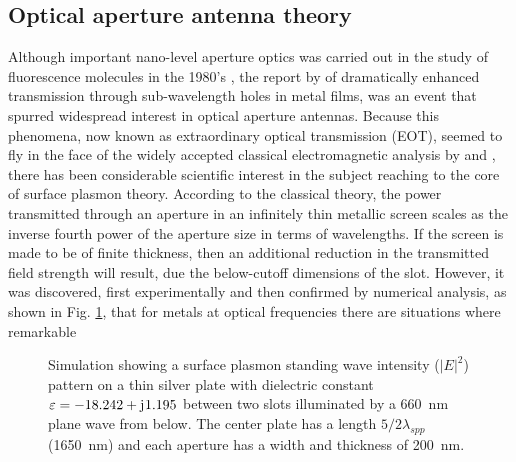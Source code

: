 \documentclass[11pt]{article}
\begin{document}
\subsection{Optical aperture antenna theory}
%
Although important nano-level aperture optics was carried out in the study of fluorescence molecules in the 1980's \cite{Fischer1986}, the report by \cite{Ebbesen1998} of dramatically enhanced transmission through sub-wavelength holes in metal films, was an event that spurred widespread interest in optical aperture antennas. Because this phenomena, now known as extraordinary optical transmission (EOT), seemed to fly in the face of the widely accepted classical electromagnetic analysis by \cite{Bethe1944} and \cite{Bouwkamp1950}, there has been considerable scientific interest in the subject reaching to the core of surface plasmon theory. According to the classical theory, the power transmitted through an aperture in an infinitely thin metallic screen scales as the inverse fourth power of the aperture size in terms of wavelengths. If the screen is made to be of finite thickness, then an additional reduction in the transmitted field strength will result, due the below-cutoff dimensions of the slot. However, it was discovered, first experimentally and then confirmed by
numerical analysis, as shown in Fig. \ref{fig:cst_simulation}, that for metals at optical frequencies there are situations where remarkable
%
\begin{figure}[h!]
  \centering
  \caption{Simulation showing a surface plasmon standing wave intensity ($|E|^2$) pattern on a thin silver plate with dielectric constant $\varepsilon= -18.242 + \mathrm{j}\mkern1mu 1.195$ between two slots illuminated by a \SI{660}{\nm} plane wave from below. The center plate has a length $5/2 \lambda_{spp}$ (\SI{1650}{\nm}) and each aperture has a width and thickness of \SI{200}{\nm}.}
  \label{fig:cst_simulation}
\end{figure}
\end{document}

